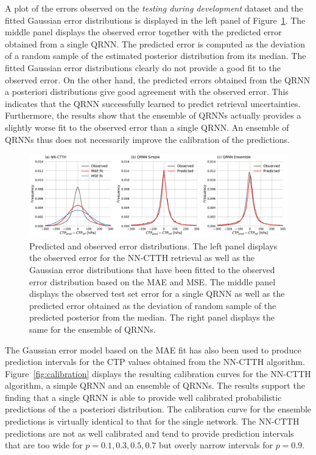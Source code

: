 \documentclass[journal abbreviation, manuscript]{copernicus}
\begin{document}
A plot of the errors observed on the \textit{testing during development} dataset
and the fitted Gaussian error distributions is displayed in the left panel of
Figure~\ref{fig:error_fit}. The middle panel displays the observed error
together with the predicted error obtained from a single QRNN. The predicted
error is computed as the deviation of a random sample of the estimated posterior
distribution from its median. The fitted Gaussian error distributions clearly do
not provide a good fit to the observed error. On the other hand, the predicted
 errors obtained from the QRNN a posteriori distributions give good agreement with
the observed error. This indicates that the QRNN successfully learned to predict
retrieval uncertainties. Furthermore, the results show that the ensemble of
QRNNs actually provides a slightly worse fit to the observed error than a single
QRNN. An ensemble of QRNNs thus does not necessarily improve the calibration of
the predictions.

  \begin{figure}[hbpt!]
    \centering
    \includegraphics[width = 1.0\linewidth]{../plots/ctp_error_fit}
    \caption{Predicted and observed error distributions. The left panel
      displays the observed error for the NN-CTTH retrieval as well as the
      Gaussian error distributions that have been fitted to the observed
      error distribution based on the MAE and MSE. The middle panel
      displays the observed test set error for a single QRNN as well as the
      predicted error obtained as the deviation of random sample of the
      predicted posterior from the median. The right panel displays
      the same for the ensemble
      of QRNNs.}
    \label{fig:error_fit}
  \end{figure}

The Gaussian error model based on the MAE fit has also been used to produce
prediction intervals for the CTP values obtained from the NN-CTTH algorithm.
Figure~\ref{fig:calibration} displays the resulting calibration curves for the
NN-CTTH algorithm, a simple QRNN and an ensemble of QRNNs. The results
support the finding that a single QRNN is able to provide well calibrated
probabilistic predictions of the a posteriori distribution. The calibration
curve for the ensemble predictions is virtually identical to that for the single
network. The NN-CTTH predictions are not as well calibrated and tend to provide
prediction intervals that are too wide for $p = 0.1, 0.3, 0.5, 0.7$ but
overly narrow intervals for $p = 0.9$.
\end{document}
